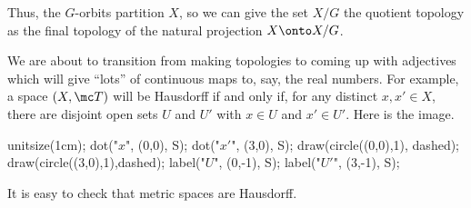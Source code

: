 \documentclass[../notes.tex]{subfiles}
\begin{document}
Thus, the $G$-orbits partition $X$, so we can give the set $X/G$ the quotient topology as the final topology of the natural projection $X\onto X/G$.
\begin{remark} \label{rem:adjectivemotivation}
	We are about to transition from making topologies to coming up with adjectives which will give ``lots'' of continuous maps to, say, the real numbers. For example, a space $(X,\mc T)$ will be Hausdorff if and only if, for any distinct $x,x'\in X$, there are disjoint open sets $U$ and $U'$ with $x\in U$ and $x'\in U'$. Here is the image.
	\begin{center}
		\begin{asy}
			unitsize(1cm);
			dot("$x$", (0,0), S); dot("$x'$", (3,0), S);
			draw(circle((0,0),1), dashed); draw(circle((3,0),1),dashed);
			label("$U$", (0,-1), S);
			label("$U'$", (3,-1), S);
		\end{asy}
	\end{center}
	It is easy to check that metric spaces are Hausdorff.
\end{remark}
\end{document}
